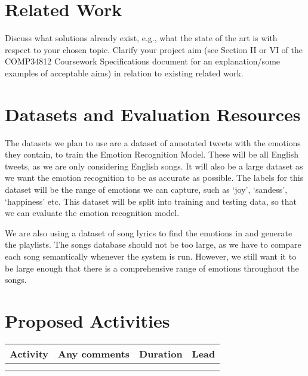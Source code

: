 \documentclass[11pt]{article}
\begin{document}
\section{Related Work}
Discuss what solutions already exist, e.g., what the state of the art is with respect to your chosen topic. Clarify your project aim (see Section II or VI of the COMP34812 Coursework Specifications document for an explanation/some examples of acceptable aims) in relation to existing related work.

\section{Datasets and Evaluation Resources}
The datasets we plan to use are a dataset of annotated tweets\cite{gupta_2021}\cite{pandey_2022} with the emotions they contain, to train the Emotion Recognition Model. These will be all English tweets, as we are only considering English songs. It will also be a large dataset as we want the emotion recognition to be as accurate as possible. The labels for this dataset will be the range of emotions we can capture, such as `joy', `sandess', `happiness' etc. This dataset will be split into training and testing data, so that we can evaluate the emotion recognition model.

We are also using a dataset of song lyrics\cite{shah_2021} to find the emotions in and generate the playlists. The songs database should not be too large, as we have to compare each song semantically whenever the system is run. However, we still want it to be large enough that there is a comprehensive range of emotions throughout the songs.

\section{Proposed Activities}

\begin{table}[h]
\centering
\begin{tabular}{|l|l|c|c|}
\hline
\textbf{Activity} & \textbf{Any comments} & \textbf{Duration} & \textbf{Lead}\\
\hline
& & & \\
\hline
& & & \\
\hline
\end{tabular}
\end{table}




\end{document}

